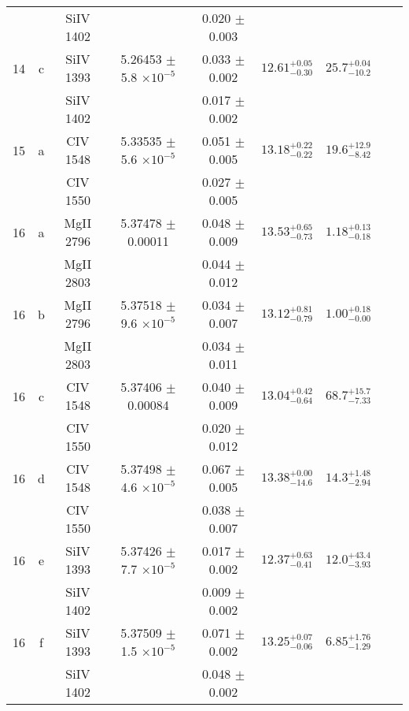 \documentclass[12pt]{article}
\begin{document}
\begin{footnotesize}
\begin{longtable}{ c c c c c c c c c}
  &   & SiIV     1402  &  &  0.020 $\pm$ 0.003   &   &     & 	 & \\ 
      14  & c  & SiIV     1393  &  5.26453 $\pm$ 5.8 $\times 10^{-5}$   &  0.033 $\pm$ 0.002   & $12.61_{ - 0.30}^{ + 0.05}$  & $25.7_{ - 10.2}^{ + 0.04}$    & 	 & \\ 
  &   & SiIV     1402  &  &  0.017 $\pm$ 0.002   &   &     & 	 & \\ 
      15  & a  & CIV     1548  &  5.33535 $\pm$ 5.6 $\times 10^{-5}$   &  0.051 $\pm$ 0.005   & $13.18_{ - 0.22}^{ + 0.22}$  & $19.6_{ - 8.42}^{ + 12.9}$    & 	 & \\ 
  &   & CIV     1550  &  &  0.027 $\pm$ 0.005   &   &     & 	 & \\ 
      16  & a  & MgII     2796  &  5.37478 $\pm$ 0.00011  &  0.048 $\pm$ 0.009   & $13.53_{ - 0.73}^{ + 0.65}$  & $1.18_{ - 0.18}^{ + 0.13}$    & 	 & \\ 
  &   & MgII     2803  &  &  0.044 $\pm$ 0.012   &   &     & 	 & \\ 
      16  & b  & MgII     2796  &  5.37518 $\pm$ 9.6 $\times 10^{-5}$   &  0.034 $\pm$ 0.007   & $13.12_{ - 0.79}^{ + 0.81}$  & $1.00_{ - 0.00}^{ + 0.18}$    & 	 & \\ 
  &   & MgII     2803  &  &  0.034 $\pm$ 0.011   &   &     & 	 & \\ 
      16  & c  & CIV     1548  &  5.37406 $\pm$ 0.00084  &  0.040 $\pm$ 0.009   & $13.04_{ - 0.64}^{ + 0.42}$  & $68.7_{ - 7.33}^{ + 15.7}$    & 	 & \\ 
  &   & CIV     1550  &  &  0.020 $\pm$ 0.012   &   &     & 	 & \\ 
      16  & d  & CIV     1548  &  5.37498 $\pm$ 4.6 $\times 10^{-5}$   &  0.067 $\pm$ 0.005   & $13.38_{ - 14.6}^{ + 0.00}$  & $14.3_{ - 2.94}^{ + 1.48}$    & 	 & \\ 
  &   & CIV     1550  &  &  0.038 $\pm$ 0.007   &   &     & 	 & \\ 
      16  & e  & SiIV     1393  &  5.37426 $\pm$ 7.7 $\times 10^{-5}$   &  0.017 $\pm$ 0.002   & $12.37_{ - 0.41}^{ + 0.63}$  & $12.0_{ - 3.93}^{ + 43.4}$    & 	 & \\ 
  &   & SiIV     1402  &  &  0.009 $\pm$ 0.002   &   &     & 	 & \\ 
      16  & f  & SiIV     1393  &  5.37509 $\pm$ 1.5 $\times 10^{-5}$   &  0.071 $\pm$ 0.002   & $13.25_{ - 0.06}^{ + 0.07}$  & $6.85_{ - 1.29}^{ + 1.76}$    & 	 & \\ 
  &   & SiIV     1402  &  &  0.048 $\pm$ 0.002   &   &     & 	 & \\ 

\end{longtable}
\end{footnotesize}
\end{document}
